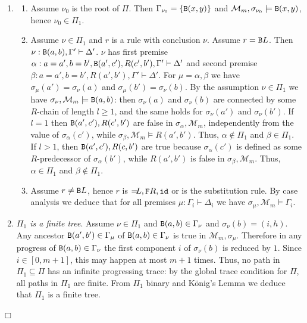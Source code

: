 \documentclass[a4paper,12pt]{article}
\newenvironment{proof}[1][Proof]{\begin{trivlist}
\item[\hskip \labelsep {\bfseries #1}]}{\end{trivlist}}
\newcommand{\setM}              { {\mathcal M} }
\newcommand{\Backward}         { {\tt B} }
\newcommand{\Forward}         { {\tt F} }
\newcommand{\id}              { {\tt id} }
\newcommand{\eqL}     {= \! \!  \!  L}
\begin{document}
\begin{proof}
\begin{enumerate}
\item
\begin{enumerate}
\item 
Assume $\nu_0$ is the root of $\Pi$. Then $\Gamma_{\nu_0}=\{\Backward(x,y)\}$ and $\setM_m, \sigma_{\nu_0} \models \Backward(x,y)$, hence $\nu_0 \in \Pi_1$. 
\item
Assume $\nu \in \Pi_1$ and $r$ is a rule with conclusion $\nu$. Assume $r=\Backward L$. Then $\nu:\Backward(a,b),\Gamma' \vdash \Delta'$. $\nu$ has first premise $\alpha:a=a',b=b',\Backward(a',c'), R(c',b'), \Gamma' \vdash \Delta'$ and second premise $\beta:a=a',b=b',R(a',b'),\Gamma' \vdash \Delta'$. For $\mu =\alpha, \beta$ we have $\sigma_\mu(a')=\sigma_\nu(a)$ and $\sigma_\mu(b')=\sigma_\nu(b)$. By the assumption $\nu \in \Pi_1$ we have $\sigma_\nu, \setM_m \models \Backward(a,b)$: then $\sigma_\nu(a)$ and $\sigma_\nu(b)$ are connected by some $R$-chain of length $l \ge 1$, and the same holds for $\sigma_\nu(a')$ and $\sigma_\nu(b')$. If $l=1$ then $\Backward(a',c'), R(c',b')$ are false in $\sigma_\alpha, \setM_m$, independently from the value of $\sigma_\alpha(c')$, while $\sigma_\beta, \setM_m \models R(a',b')$. Thus, $\alpha \not \in \Pi_1$ and $\beta \in \Pi_1$. If $l>1$, then $\Backward(a',c'), R(c,b')$ are true because $\sigma_\alpha(c')$ is defined as some $R$-predecessor of $\sigma_\alpha(b')$, while $R(a',b')$ is false in $\sigma_\beta, \setM_m$. Thus, $\alpha \in \Pi_1$ and $\beta \not \in \Pi_1$. 
\item
Assume $r \not = \Backward L$, hence $r$ is $\eqL, \Forward R, \id$ or is the substitution rule. By case analysis we deduce that for all premises $\mu:\Gamma_i \vdash \Delta_i$ we have $\sigma_\mu, \setM_m \models \Gamma_i$. 
\end{enumerate}

\item
\emph{$\Pi_1$ is a finite tree}. Assume $\nu \in \Pi_1$ and $\Backward(a,b) \in \Gamma_\nu$ and $\sigma_\nu(b) = (i,h)$. Any ancestor $\Backward(a',b') \in \Gamma_\mu$ of $\Backward(a,b) \in \Gamma_\nu$ is true in $\setM_m, \sigma_\mu$. Therefore in any progress of $\Backward(a,b)  \in \Gamma_\nu$ the first component $i$ of $\sigma_\nu(b)$ is reduced by $1$. Since $i \in [0,m+1]$, this may happen at most $m+1$ times. Thus, no path in $\Pi_1 \subseteq \Pi$ has an infinite progressing trace: by the global trace condition for $\Pi$, all paths in $\Pi_1$ are finite. From $\Pi_1$ binary and K\"{o}nig's Lemma we deduce that $\Pi_1$ is a finite tree.
\end{enumerate}
$\Box$
\end{proof}
\end{document}
